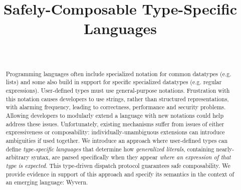 \documentclass[runningheads]{llncs}
\newcommand{\todo}[1]{\textbf{[TODO: #1]}}
\begin{document}
\title{Safely-Composable Type-Specific Languages}
\author{~}
\institute{~}

\maketitle


\begin{abstract}
Programming languages often include specialized notation for common datatypes (e.g. lists) and some also build in support for specific specialized datatypes (e.g. regular expressions). User-defined types must use general-purpose notations. Frustration with this notation causes developers to use strings, rather than structured representations, with alarming frequency, leading to correctness, performance and security problems.
Allowing developers to modularly extend a language with new notations could help address these issues. Unfortunately, existing mechanisms suffer from issues of either expressiveness or composability: individually-unambiguous extensions can introduce ambiguities if used together. We introduce an approach where user-defined types can define \emph{type-specific languages} that determine how \emph{generalized literals}, containing nearly-arbitrary syntax, are parsed specifically when they appear \emph{where an expression of that type is expected}. This type-driven dispatch protocol guarantees safe composability. We provide evidence in support of  this approach and specify its semantics in the context of an emerging language: Wyvern.


\end{abstract}
\end{document}

